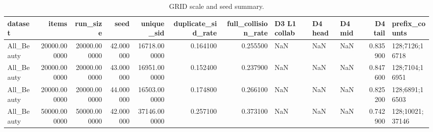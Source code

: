 \begin{table}
\caption{GRID scale and seed summary.}
\label{tab:grid-scale}
\begin{tabular}{lrrrrrrlllrl}
\toprule
dataset & items & run\_size & seed & unique\_sid & duplicate\_sid\_rate & full\_collision\_rate & D3 L1 collab & D4 head & D4 mid & D4 tail & prefix\_counts \\
\midrule
All\_Beauty & 20000.000000 & 20000.000000 & 42.000000 & 16718.000000 & 0.164100 & 0.255500 & NaN & NaN & NaN & 0.835900 & 128;7126;16718 \\
All\_Beauty & 20000.000000 & 20000.000000 & 43.000000 & 16951.000000 & 0.152400 & 0.237900 & NaN & NaN & NaN & 0.847600 & 128;7104;16951 \\
All\_Beauty & 20000.000000 & 20000.000000 & 44.000000 & 16503.000000 & 0.174800 & 0.266100 & NaN & NaN & NaN & 0.825200 & 128;6891;16503 \\
All\_Beauty & 50000.000000 & 50000.000000 & 42.000000 & 37146.000000 & 0.257100 & 0.373100 & NaN & NaN & NaN & 0.742900 & 128;10021;37146 \\
\bottomrule
\end{tabular}
\end{table}

